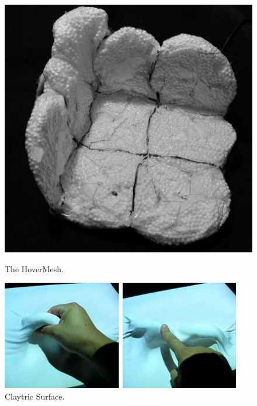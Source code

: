 \begin{figure}[h]
  \centering
  \begin{minipage}[t]{.45\textwidth}
    \centering
    \includegraphics[width=.9\linewidth]{figures/jamming/hovermesh}
    \caption[The HoverMesh by \citet{mazzone2004hovermesh}.]
    {The HoverMesh.}
    \label{fig:ch:jamming:hovermesh}
  \end{minipage}%
  \hspace{0.5cm}
  \begin{minipage}[t]{.45\textwidth}
    \centering
    \includegraphics[width=.9\linewidth]{figures/jamming/claytric-surface}
    \caption[Claytric Surface by \citet{matoba2012claytricsurface}.]
    {Claytric Surface.}
    \label{fig:ch:jamming:claytric-surface}
  \end{minipage}
\end{figure}

